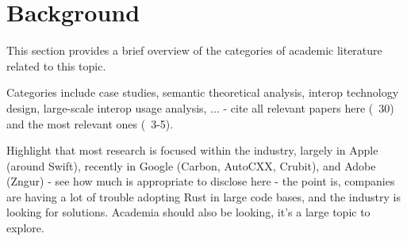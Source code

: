 \section{Background}
\label{sec:background}


This section provides a brief overview of the categories of academic literature related to this topic.

Categories include case studies, semantic theoretical analysis, interop technology design, large-scale interop usage analysis, ... - cite all relevant papers here (~30) and the most relevant ones (~3-5).

Highlight that most research is focused within the industry, largely in Apple (around Swift), recently in Google (Carbon, AutoCXX, Crubit), and Adobe (Zngur) - see how much is appropriate to disclose here - the point is, companies are having a lot of trouble adopting Rust in large code bases, and the industry is looking for solutions. Academia should also be looking, it's a large topic to explore.
